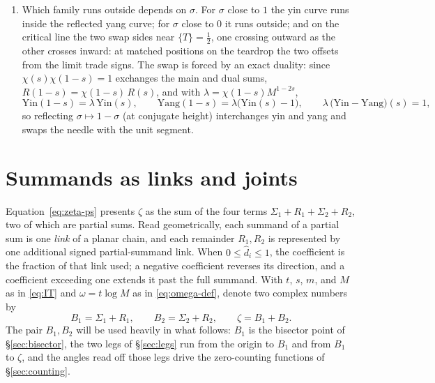 \documentclass[11pt]{article}
\theoremstyle{definition}
\begin{document}
\begin{enumerate}
from $1$ and the yang point (both $1-\hat d_1$), so the pair rides two
concentric circles centered at the moving crossing, with radii summing
to $1$.
\item Which family runs outside depends on $\sigma$. For $\sigma$ close
to $1$ the yin curve runs inside the reflected yang curve; for $\sigma$
close to $0$ it runs outside; and on the critical line the two swap
sides near $\{T\}=\tfrac12$, one crossing outward as the other crosses
inward: at matched positions on the teardrop the two offsets from the
limit trade signs. The swap is forced by an exact duality: since
$\chi(s)\chi(1-s)=1$ exchanges the main and dual sums,
$R(1-s)=\chi(1-s)\,R(s)$, and with $\lambda=\chi(1-s)M^{1-2s}$,
\[
\mathrm{Yin}(1-s)=\lambda\,\mathrm{Yin}(s),\qquad
\mathrm{Yang}(1-s)=\lambda\bigl(\mathrm{Yin}(s)-1\bigr),\qquad
\lambda\,\bigl(\mathrm{Yin}-\mathrm{Yang}\bigr)(s)=1,
\]
so reflecting $\sigma\mapsto1-\sigma$ (at conjugate height)
interchanges yin and yang and swaps the needle with the unit segment.
\end{enumerate}

\clearpage

\section{Summands as links and joints}\label{sec:matrix-product}

Equation~\eqref{eq:zeta-ps} presents $\zeta$ as the sum of the four terms
$\Sigma_1+R_{1}+\Sigma_2+R_{2}$, two of which are partial sums. Read
geometrically, each summand of a partial sum is one \emph{link} of a
planar chain, and each remainder $R_{1},R_{2}$ is represented by one
additional signed partial-summand link. When $0\leq\hat d_i\leq1$, the
coefficient is the fraction of that link used; a negative coefficient
reverses its direction, and a coefficient exceeding one extends it past
the full summand.
With $t$, $s$, $m$, and $M$ as in \eqref{eq:IT} and $\omega=t\log M$ as in
\eqref{eq:omega-def}, denote two complex numbers by
\begin{equation}
B_1=\Sigma_1+R_{1},\qquad B_2=\Sigma_2+R_{2},\qquad \zeta=B_1+B_2 .
\end{equation}
The pair $B_1,B_2$ will be used heavily in what follows: $B_1$ is the
bisector point of \S\ref{sec:bisector}, the two legs of
\S\ref{sec:legs} run from the origin to $B_1$ and from $B_1$ to $\zeta$,
and the angles read off those legs drive the zero-counting functions of
\S\ref{sec:counting}.
\end{document}
